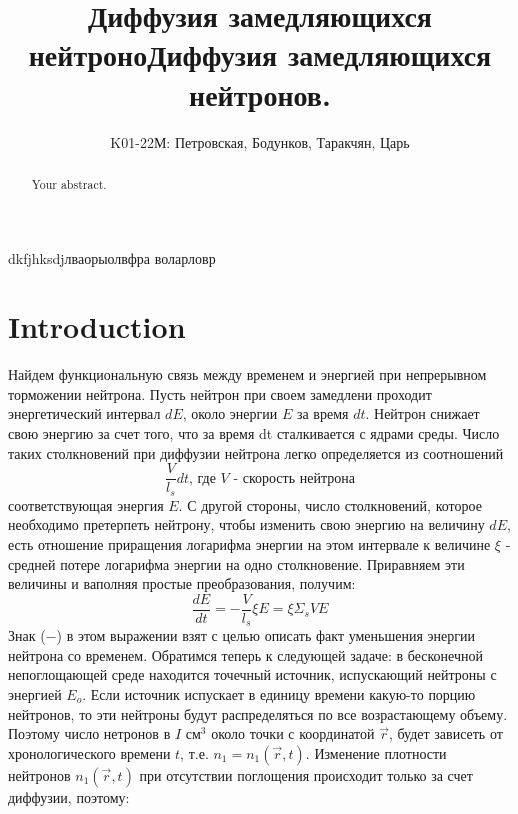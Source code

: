 \documentclass[a4paper]{article}
\title{Диффузия замедляющихся нейтроноДиффузия замедляющихся нейтронов.}
\author{K01-22М: Петровская, Бодунков, Таракчян, Царь}
\begin{document}
\maketitle
dkfjhksdjлваорыолвфра
воларловр
\begin{abstract}
Your abstract.
\end{abstract}

\section{Introduction}
    Найдем функциональную связь между временем и энергией
    при непрерывном торможении нейтрона. Пусть нейтрон при
    своем замедлени проходит энергетический интервал $dE$,
    около энергии $E$ за время $dt$. Нейтрон снижает свою
    энергию за счет того, что за время dt сталкивается с ядрами среды.
    \newline
    Число таких столкновений при диффузии нейтрона легко определяется 
    из соотношений
    \begin{equation}
        \frac{V}{l_s}dt
        \text{, где $V$ - скорость нейтрона}
    \end{equation}
    соответствующая энергия $E$.
    \newline
    С другой стороны, число столкновений, которое необходимо
    претерпеть нейтрону, чтобы изменить свою энергию на величину $dE$,
    есть отношение приращения логарифма энергии на этом интервале к
    величине $\xi$ - средней потере логарифма энергии на одно
    столкновение. Приравняем эти величины и ваполняя простые
    преобразования, получим:
    \begin{equation}
        \frac{dE}{dt} = -\frac{V}{l_s}\xi E = \xi \Sigma_s V E
    \end{equation}
    Знак ($-$) в этом выражении взят с целью описать факт уменьшения
    энергии нейтрона со временем.
    \newline
    Обратимся теперь к следующей задаче: в бесконечной непоглощающей
    среде находится точечный источник, испускающий нейтроны с энергией
    $E_o$. Если источник испускает в единицу времени какую-то порцию
    нейтронов, то эти нейтроны будут распределяться по все
    возрастающему объему. Поэтому число нетронов в $I \text{ см}^3$
    около точки с координатой $\overrightarrow{r}$, будет зависеть от
    хронологического времени
    $t$, т.е. \( n_1 = n_1 (\overrightarrow{r},t) \).
    \newline
    Изменение плотности нейтронов $n_1(\overrightarrow{r},t)$ при
    отсутствии поглощения происходит только за счет диффузии, поэтому:
\end{document}
